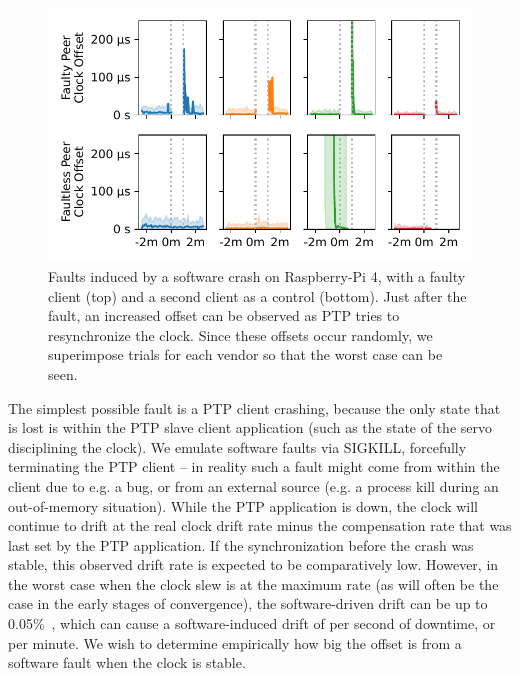 \begin{figure}
    \centering
    \includegraphics[width=\linewidth]{res/generated/fault/software/slave_rpi-4_peer_comparison.pdf}
    \legend
    \caption{Faults induced by a software crash on Raspberry-Pi 4, with a faulty client (top) and a second client as a control (bottom). Just after the fault, an increased offset can be observed as PTP tries to resynchronize the clock. Since these offsets occur randomly, we superimpose \fNum{\bSoftwareFaultNumProfiles} trials for each vendor so that the worst case can be seen.}
    \label{fig:software_fault}
\end{figure}

The simplest possible fault is a PTP client crashing, because the only state that is lost is within the PTP slave client application (such as the state of the servo disciplining the clock). We emulate software faults via SIGKILL, forcefully terminating the PTP client -- in reality such a fault might come from within the client due to e.g. a bug, or from an external source (e.g. a process kill during an out-of-memory situation). While the PTP application is down, the clock will continue to drift at the real clock drift rate minus the compensation rate that was last set by the PTP application. If the synchronization before the crash was stable, this observed drift rate is expected to be comparatively low. However, in the worst case when the clock slew is at the maximum rate (as will often be the case in the early stages of convergence), the software-driven drift can be up to 0.05\%~\cite{adjtimex}, which can cause a software-induced drift of  per second of downtime, or \fTimeMS{\windowOfUncertaintyOneMinute} per minute. We wish to determine empirically how big the offset is from a software fault when the clock is stable.

